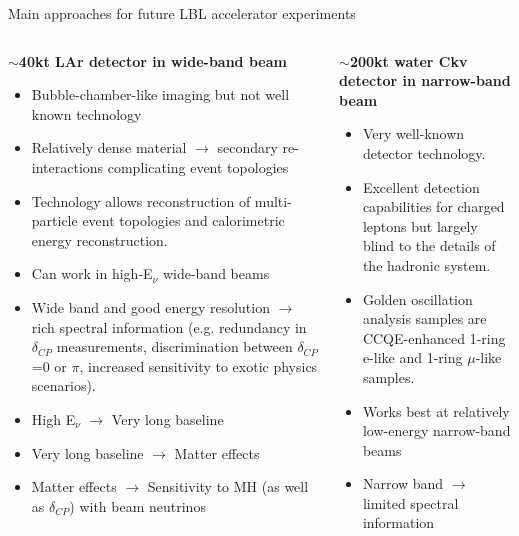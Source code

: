 \begin{frame}{Main approaches for future LBL accelerator experiments}

\begin{columns}[T]
  \begin{column}{0.48\textwidth}
      {\scriptsize
        {\bf $\sim$40kt LAr detector in wide-band beam}\\
        \begin{itemize}
          \item Bubble-chamber-like imaging but not well known technology
          \item Relatively dense material $\rightarrow$ secondary re-interactions complicating event topologies
          \item Technology allows reconstruction of multi-particle event topologies and calorimetric energy reconstruction.
          \item Can work in high-E$_{\nu}$ wide-band beams
          \item Wide band and good energy resolution $\rightarrow$ rich spectral information
                (e.g. redundancy in $\delta_{CP}$ measurements, discrimination between $\delta_{CP}$=0 or $\pi$,
                increased sensitivity to exotic physics scenarios).
         \item High E$_{\nu}$ $\rightarrow$ Very long baseline
         \item Very long baseline $\rightarrow$ Matter effects
         \item Matter effects $\rightarrow$ Sensitivity to MH (as well as $\delta_{CP}$) with beam neutrinos
        \end{itemize}
      }
  \end{column}
  \begin{column}{0.52\textwidth}
      {\scriptsize
        {\bf $\sim$200kt water Ckv detector in narrow-band beam}\\
        \begin{itemize}
         \item Very well-known detector technology.
         \item Excellent detection capabilities for charged leptons but largely blind to the details of the hadronic system.
         \item Golden oscillation analysis samples are CCQE-enhanced 1-ring e-like and 1-ring $\mu$-like samples.
         \item Works best at relatively low-energy narrow-band beams
         \item Narrow band  $\rightarrow$ limited spectral information

\end{itemize}}
\end{column}
\end{columns}
\end{frame}
